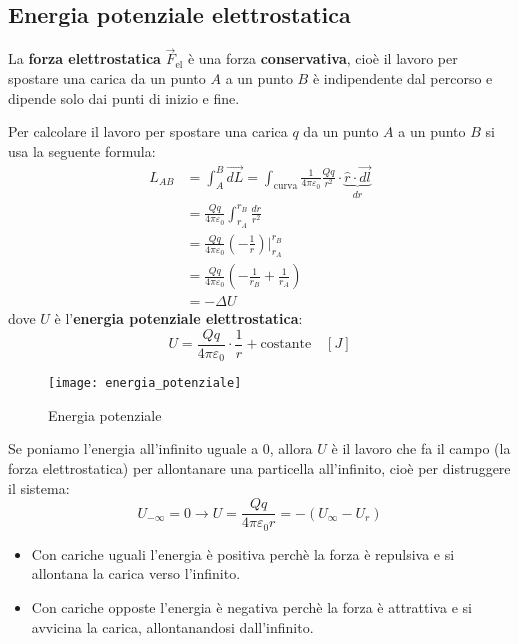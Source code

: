 \documentclass[a4paper]{article}
\begin{document}
\subsection{Energia potenziale elettrostatica}
La \textbf{forza elettrostatica} \( \vec{F}_{\text{el}} \) è una forza 
\textbf{conservativa}, cioè il lavoro per spostare una carica da un punto \( A \) a un 
punto \( B \) è indipendente dal percorso e dipende solo dai punti di inizio e fine.

Per calcolare il lavoro per spostare una carica \( q \) da un punto \( A \) a un punto \( B \)
si usa la seguente formula:
\[
  \begin{aligned}
    L_{AB} &= \int_{A}^{B} \vec{dL} = \int_{\text{curva}} \frac{1}{4 \pi \varepsilon_0}
    \frac{Qq}{r^2} \cdot \underbrace{\hat{r} \cdot \vec{dl}}_{dr}\\
           &= \frac{Qq}{4 \pi \varepsilon_0} \int_{r_A}^{r_B} \frac{dr}{r^2}\\
           &= \frac{Qq}{4 \pi \varepsilon_0} \left( - \frac{1}{r} \right) \Big|_{r_A}^{r_B}\\
           &= \frac{Qq}{4 \pi \varepsilon_0} \left( - \frac{1}{r_B} + \frac{1}{r_A} \right)\\
           &= - \Delta U
  \end{aligned}
\] 
dove \( U \) è l'\textbf{energia potenziale elettrostatica}:
\[
  U = \frac{Qq}{4 \pi \varepsilon_0} \cdot \frac{1}{r} + \text{costante} \quad [J]
\] 
\begin{figure}[H]
  \centering
  \texttt{[image: energia\_potenziale]}
  \caption{Energia potenziale}
\end{figure}

\vspace{1em}
\noindent
Se poniamo l'energia all'infinito uguale a 0, allora \( U \) è il lavoro che fa il
campo (la forza elettrostatica) per allontanare una particella all'infinito, cioè per
distruggere il sistema:
\[
  U_{- \infty} = 0 \to U = \frac{Qq}{4 \pi \varepsilon_0 r} = - \left( U_{\infty} - U_r \right) 
\] 
\begin{itemize}
  \item Con cariche uguali l'energia è positiva perchè la forza è repulsiva e si allontana
    la carica verso l'infinito.
  \item Con cariche opposte l'energia è negativa perchè la forza è attrattiva e si avvicina
    la carica, allontanandosi dall'infinito.
\end{itemize}
\end{document}
